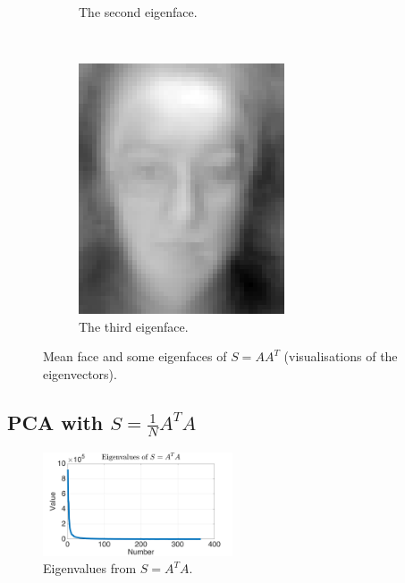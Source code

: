 \documentclass[a4paper, 10pt, conference]{ieeeconf}
\begin{document}
\begin{figure}[!ht]
\begin{subfigure}{0.1\textwidth}
                \caption{The second eigenface.}
                \label{fig:eigface2}
        \end{subfigure}
        ~
        \begin{subfigure}{0.1\textwidth}
          \includegraphics[width=\textwidth]{src/eigface3.png}
                \caption{The third eigenface.}
                \label{fig:eigface3}
        \end{subfigure}
	\caption{Mean face and some eigenfaces of $S = AA^T$ (visualisations of the eigenvectors).}
\end{figure}

\subsection{PCA with $S = \frac{1}{N}A^{T}A$}

\begin{figure}[!ht]
    \centering
    \includegraphics[width=0.5\textwidth]{src/S2_eig_val_rounded.png}
    \caption{Eigenvalues from $S = A^T A$.}
    \label{fig:S2_eig_val}
\end{figure}
\end{document}
